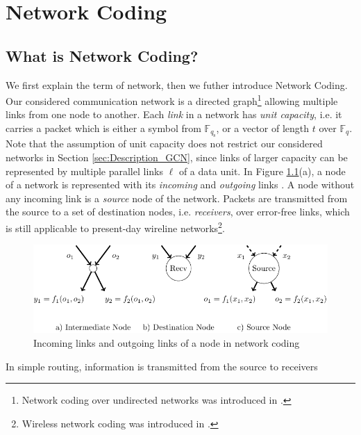 \chapter{Network Coding} \label{chap:network_coding}

\section{What is Network Coding? \label{sec:What-is-NC}}

We first explain the term of network, then we futher introduce Network
Coding. Our considered communication network is a directed graph\footnote{Network coding over undirected networks was introduced in \cite{Li:2004}.}
allowing multiple links from one node to another. Each \textit{link}
in a network has \textit{unit capacity}, i.e. it carries a packet
which is either a symbol from $\ensuremath{\mathbb{F}}_{q_{\mathrm{s}}}$,
or a vector of length $t$ over $\ensuremath{\mathbb{F}}_{q}$. Note
that the assumption of unit capacity does not restrict our considered
networks in Section \ref{sec:Description_GCN}, since links of larger
capacity can be represented by multiple parallel links $\ell$ of
a data unit. In Figure \ref{fig:incoming_links}(a), a node of a network
is represented with its \textit{incoming} and \textit{outgoing }links
. A node without any incoming link is a \textit{source} node of the
network. Packets are transmitted from the source to a set of destination
nodes, i.e. \textit{receivers}, over error-free links, which is still
applicable to present-day wireline networks\footnote{Wireless network coding was introduced in \cite{Katti:2008}.}.
\begin{figure}[H]
\caption{Incoming links and outgoing links of a node in network coding \label{fig:incoming_links}}

\centering{}\includegraphics[height=0.15\paperwidth]{./figures/incoming_edges}
\end{figure}
In simple routing, information is transmitted from the source to receivers
